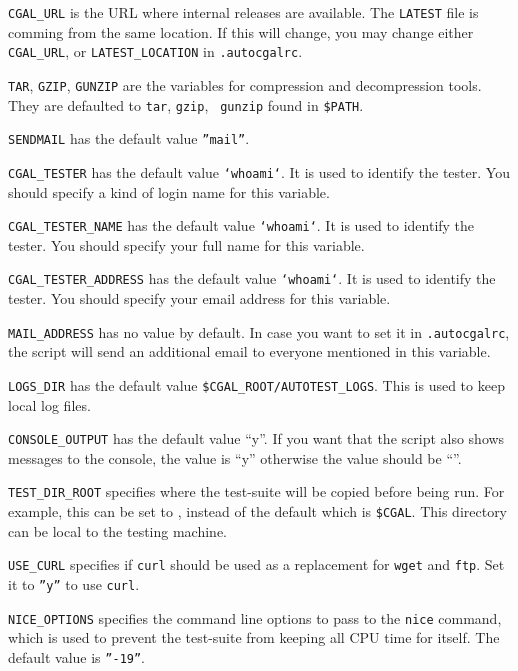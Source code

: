{\tt CGAL\_URL} is the URL where internal releases are available.
The {\tt LATEST} file is comming from the same location. If this will change,
you may change either {\tt CGAL\_URL}, or {\tt LATEST\_LOCATION}
in {\tt .autocgalrc}.

{\tt TAR}, {\tt GZIP}, {\tt GUNZIP} are the variables for compression and
decompression tools.  They are defaulted to {\tt tar}, {\tt gzip}, {\tt
gunzip} found in {\tt \$PATH}.

{\tt SENDMAIL} has the default value {\tt ''mail''}.

{\tt CGAL\_TESTER} has the default value {\tt `whoami`}.  It is used to
identify the tester.  You should specify a kind of login name for this
variable.

{\tt CGAL\_TESTER\_NAME} has the default value {\tt `whoami`}.  It is used to
identify the tester.  You should specify your full name for this variable.

{\tt CGAL\_TESTER\_ADDRESS} has the default value {\tt `whoami`}.  It is used
to identify the tester.  You should specify your email address for this
variable.

{\tt MAIL\_ADDRESS} has no value by default. In case you want to
set it in {\tt .autocgalrc}, the script will send an additional email to
everyone mentioned in this variable.    

{\tt LOGS\_DIR} has the default value {\tt \$CGAL\_ROOT/AUTOTEST\_LOGS}.  This
is used to keep local log files.

{\tt CONSOLE\_OUTPUT} has the default value ``y''. If you want that the script
 also shows messages to the console, the value is ``y'' otherwise the value 
should be ``''.

{\tt TEST\_DIR\_ROOT} specifies where the test-suite will be copied before
being run.  For example, this can be set to , instead of the default
which is {\tt \$CGAL}.  This directory can be local to the testing machine.

{\tt USE\_CURL} specifies if {\tt curl} should be used as a replacement for
{\tt wget} and {\tt ftp}.  Set it to {\tt ''y''} to use {\tt curl}.

{\tt NICE\_OPTIONS} specifies the command line options to pass to the
{\tt nice} command, which is used to prevent the test-suite from keeping
all CPU time for itself.  The default value is {\tt ''-19''}.




